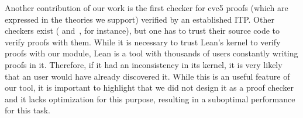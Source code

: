 Another contribution of our work is the first checker for cvc5 proofs
(which are expressed in the theories we support) verified by an established ITP.\@
%
Other checkers exist (\cite{carcara} and~\cite{lfsc}, for instance), but one has to
trust their source code to verify proofs with them. While it is necessary
to trust Lean's kernel to verify proofs with our module, Lean is a tool
with thousands of users constantly writing proofs in it. Therefore,
if it had an inconsistency in its kernel, it is very likely that
an user would have already discovered it.
%
While this is an useful feature of our tool, it is important to highlight that
we did not design it as a proof checker and it lacks optimization for this purpose,
resulting in a suboptimal performance for this task.

